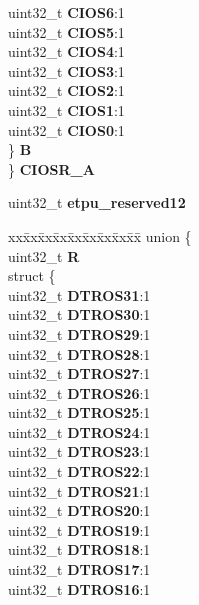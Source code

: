 \begin{DoxyCompactItemize}
\begin{tabbing}
\>\>uint32\_t {\bfseries CIOS6}:1\\
\>\>uint32\_t {\bfseries CIOS5}:1\\
\>\>uint32\_t {\bfseries CIOS4}:1\\
\>\>uint32\_t {\bfseries CIOS3}:1\\
\>\>uint32\_t {\bfseries CIOS2}:1\\
\>\>uint32\_t {\bfseries CIOS1}:1\\
\>\>uint32\_t {\bfseries CIOS0}:1\\
\>\} {\bfseries B}\\
\} {\bfseries CIOSR\_A}\\

\end{tabbing}\item 
\mbox{\label{structETPU__tag_a446ca86c1b8e7550d3fb34018dffdc99}} 
uint32\+\_\+t {\bfseries etpu\+\_\+reserved12}
\item 
\mbox{\label{structETPU__tag_a790a1fb43fafba4628f261768f074266}} 
\begin{tabbing}
xx\=xx\=xx\=xx\=xx\=xx\=xx\=xx\=xx\=\kill
union \{\\
\>uint32\_t {\bfseries R}\\
\>struct \{\\
\>\>uint32\_t {\bfseries DTROS31}:1\\
\>\>uint32\_t {\bfseries DTROS30}:1\\
\>\>uint32\_t {\bfseries DTROS29}:1\\
\>\>uint32\_t {\bfseries DTROS28}:1\\
\>\>uint32\_t {\bfseries DTROS27}:1\\
\>\>uint32\_t {\bfseries DTROS26}:1\\
\>\>uint32\_t {\bfseries DTROS25}:1\\
\>\>uint32\_t {\bfseries DTROS24}:1\\
\>\>uint32\_t {\bfseries DTROS23}:1\\
\>\>uint32\_t {\bfseries DTROS22}:1\\
\>\>uint32\_t {\bfseries DTROS21}:1\\
\>\>uint32\_t {\bfseries DTROS20}:1\\
\>\>uint32\_t {\bfseries DTROS19}:1\\
\>\>uint32\_t {\bfseries DTROS18}:1\\
\>\>uint32\_t {\bfseries DTROS17}:1\\
\>\>uint32\_t {\bfseries DTROS16}:1\\

\end{tabbing}
\end{DoxyCompactItemize}
